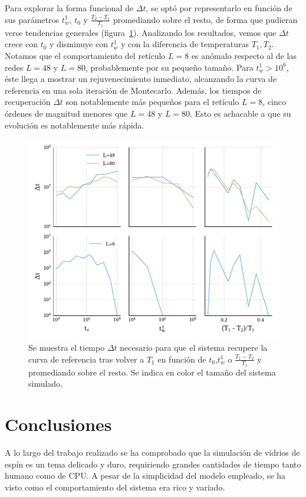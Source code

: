 \documentclass[11pt]{report}
\begin{document}
Para explorar la forma funcional de $Δt$, se optó por representarlo en
función de sus parámetros $t_w^1$, $t_0$ y $\frac{T_2-T_1}{T_1}$
promediando sobre el resto, de forma que pudieran verse tendencias
generales (figura~\ref{fig:memdep}). Analizando los resultados, vemos
que $Δt$ crece con $t_0$ y disminuye con $t_w^1$ y con la diferencia
de temperaturas $T_1, T_2$. Notamos que el comportamiento del retículo
$L=8$ es anómalo respecto al de las redes $L=48$ y $L=80$,
probablemente por su pequeño tamaño. Para $t_w^1 > 10^6$, éste llega a
mostrar un rejuvenecimiento inmediato, alcanzando la curva de
referencia en una sola iteración de Montecarlo. Además, los tiempos de
recuperación $Δt$ son notablemente más pequeños para el retículo
$L=8$, cinco órdenes de magnitud menores que $L=48$ y $L=80$. Esto es
achacable a que su evolución es notablemente más rápida.

\begin{figure}
  \centering
  \includegraphics{../study_cases/memory/dependences.pdf}
  \caption{Se muestra el tiempo $Δt$ necesario para que el sistema
    recupere la curva de referencia tras volver a $T_1$ en función de
    $t_0$,$t_w^1$ o $\frac{T_1-T_2}{T_1}$ y promediando sobre el
    resto. Se indica en color el tamaño del sistema simulado.}
  \label{fig:memdep}
\end{figure}



\chapter{Conclusiones}
A lo largo del trabajo realizado se ha comprobado que la simulación de
vidrios de espín es un tema delicado y duro, requiriendo grandes
cantidades de tiempo tanto humano como de CPU. A pesar de la
simplicidad del modelo empleado, se ha visto como el comportamiento
del sistema era rico y variado.
\end{document}
